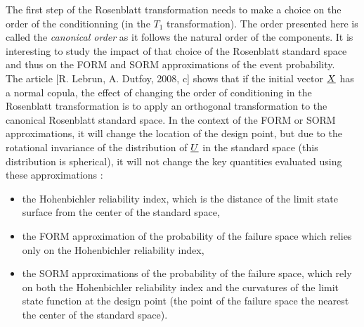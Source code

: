             {

              The first step of the Rosenblatt transformation needs to make a choice on the order of the conditionning (in the $T_1$ transformation). The order presented here is called the \emph{canonical order} as it follows the natural order of the components. It is interesting to study the impact of that choice of the Rosenblatt standard space and thus on the FORM and SORM approximations of the event probability.\\

              The article [R. Lebrun, A. Dutfoy, 2008, c] shows that if the initial vector ${\underline{X}}$ has a normal copula, the effect of changing the order of conditioning in the Rosenblatt transformation  is to apply an orthogonal transformation to the canonical Rosenblatt standard space. In the context of the FORM or SORM approximations, it will change the location of the design point, but due to the rotational invariance of the distribution of ${\underline{U}}$ in the standard space (this distribution is spherical), it will not change the key quantities evaluated using these approximations :
              \begin{itemize}
              \item the Hohenbichler reliability index, which is the distance of the limit state surface from the center of the standard space,
              \item the FORM approximation of the probability of the failure space which relies only on the  Hohenbichler reliability index,
              \item the SORM approximations of the probability of the failure space, which rely on both the Hohenbichler reliability index and the curvatures of the limit state function at the design point (the point of the failure space the nearest the center of the standard space).
              \end{itemize}

}
